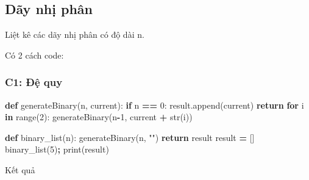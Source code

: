 \documentclass[
]{article}
\newenvironment{Shaded}{\begin{snugshade}}{\end{snugshade}}
\newcommand{\BuiltInTok}[1]{#1}
\newcommand{\ControlFlowTok}[1]{\textcolor[rgb]{0.13,0.29,0.53}{\textbf{#1}}}
\newcommand{\DecValTok}[1]{\textcolor[rgb]{0.00,0.00,0.81}{#1}}
\newcommand{\KeywordTok}[1]{\textcolor[rgb]{0.13,0.29,0.53}{\textbf{#1}}}
\newcommand{\NormalTok}[1]{#1}
\newcommand{\OperatorTok}[1]{\textcolor[rgb]{0.81,0.36,0.00}{\textbf{#1}}}
\newcommand{\StringTok}[1]{\textcolor[rgb]{0.31,0.60,0.02}{#1}}
\begin{document}
\hypertarget{duxe3y-nhux1ecb-phuxe2n}{%
\subsection{Dãy nhị phân}\label{duxe3y-nhux1ecb-phuxe2n}}

Liệt kê các dãy nhị phân có độ dài n.

Có 2 cách code:

\hypertarget{c1-ux111ux1ec7-quy}{%
\subsubsection{C1: Đệ quy}\label{c1-ux111ux1ec7-quy}}

\begin{Shaded}
\begin{Highlighting}[]
\KeywordTok{def}\NormalTok{ generateBinary(n, current):}
    \ControlFlowTok{if}\NormalTok{ n }\OperatorTok{==} \DecValTok{0}\NormalTok{:}
\NormalTok{        result.append(current)}
        \ControlFlowTok{return}
    \ControlFlowTok{for}\NormalTok{ i }\KeywordTok{in} \BuiltInTok{range}\NormalTok{(}\DecValTok{2}\NormalTok{):}
\NormalTok{        generateBinary(n}\OperatorTok{{-}}\DecValTok{1}\NormalTok{, current }\OperatorTok{+} \BuiltInTok{str}\NormalTok{(i))}

\KeywordTok{def}\NormalTok{ binary\_list(n):}
\NormalTok{        generateBinary(n, }\StringTok{""}\NormalTok{)}
        \ControlFlowTok{return}\NormalTok{ result}
\NormalTok{result }\OperatorTok{=}\NormalTok{ []}
\NormalTok{binary\_list(}\DecValTok{5}\NormalTok{)}\OperatorTok{;}
\BuiltInTok{print}\NormalTok{(result)}
\end{Highlighting}
\end{Shaded}

Kết quả
\end{document}
